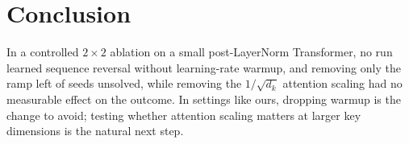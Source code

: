 \section{Conclusion}
\label{sec:conclusion}

In a controlled $2\times 2$ ablation on a small post-LayerNorm Transformer, no run learned sequence reversal
without learning-rate warmup, and removing only the ramp left \valRampUnsolved{} of \valRampRuns{} seeds unsolved, while removing the $1/\sqrt{d_k}$ attention scaling had no measurable effect on the
outcome. In settings
like ours, dropping warmup is the change to avoid; testing whether attention scaling matters at larger key
dimensions is the natural next step.
